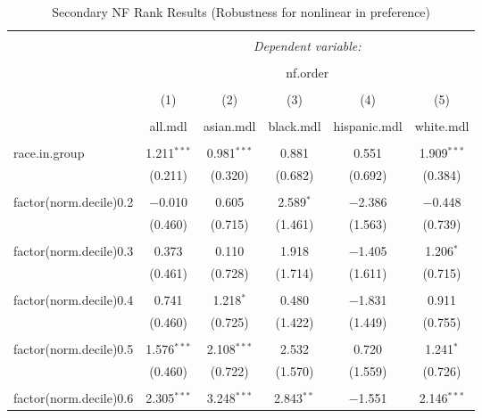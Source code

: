 
\begin{table}[!htbp] \centering 
  \caption{Secondary NF Rank Results (Robustness for nonlinear in preference)} 
  \label{} 
\begin{tabular}{@{\extracolsep{5pt}}lccccc} 
\\[-1.8ex]\hline 
\hline \\[-1.8ex] 
 & \multicolumn{5}{c}{\textit{Dependent variable:}} \\ 
\cline{2-6} 
\\[-1.8ex] & \multicolumn{5}{c}{nf.order} \\ 
\\[-1.8ex] & (1) & (2) & (3) & (4) & (5)\\ 
\\[-1.8ex] & all.mdl & asian.mdl & black.mdl & hispanic.mdl & white.mdl\\ 
\hline \\[-1.8ex] 
 race.in.group & 1.211$^{***}$ & 0.981$^{***}$ & 0.881 & 0.551 & 1.909$^{***}$ \\ 
  & (0.211) & (0.320) & (0.682) & (0.692) & (0.384) \\ 
  & & & & & \\ 
 factor(norm.decile)0.2 & $-$0.010 & 0.605 & 2.589$^{*}$ & $-$2.386 & $-$0.448 \\ 
  & (0.460) & (0.715) & (1.461) & (1.563) & (0.739) \\ 
  & & & & & \\ 
 factor(norm.decile)0.3 & 0.373 & 0.110 & 1.918 & $-$1.405 & 1.206$^{*}$ \\ 
  & (0.461) & (0.728) & (1.714) & (1.611) & (0.715) \\ 
  & & & & & \\ 
 factor(norm.decile)0.4 & 0.741 & 1.218$^{*}$ & 0.480 & $-$1.831 & 0.911 \\ 
  & (0.460) & (0.725) & (1.422) & (1.449) & (0.755) \\ 
  & & & & & \\ 
 factor(norm.decile)0.5 & 1.576$^{***}$ & 2.108$^{***}$ & 2.532 & 0.720 & 1.241$^{*}$ \\ 
  & (0.460) & (0.722) & (1.570) & (1.559) & (0.726) \\ 
  & & & & & \\ 
 factor(norm.decile)0.6 & 2.305$^{***}$ & 3.248$^{***}$ & 2.843$^{**}$ & $-$1.551 & 2.146$^{***}$ \\ 

\end{tabular}
\end{table}
